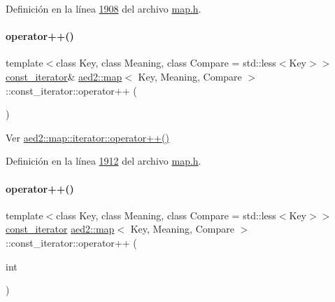 Definición en la línea \hyperlink{map_8h_source_l01908}{1908} del archivo \hyperlink{map_8h_source}{map.\+h}.

\mbox{\label{classaed2_1_1map_1_1const__iterator_adaada1d489552555135d2ea89c67c271_adaada1d489552555135d2ea89c67c271}} 
\paragraph{\texorpdfstring{operator++()}{operator++()}\hspace{0.1cm}{\footnotesize\ttfamily [1/2]}}
{\footnotesize\ttfamily template$<$class Key, class Meaning, class Compare = std\+::less$<$\+Key$>$$>$ \\
\hyperlink{classaed2_1_1map_1_1const__iterator}{const\+\_\+iterator}\& \hyperlink{classaed2_1_1map}{aed2\+::map}$<$ Key, Meaning, Compare $>$\+::const\+\_\+iterator\+::operator++ (\begin{DoxyParamCaption}{ }\end{DoxyParamCaption})\hspace{0.3cm}{\ttfamily [inline]}}



Ver \hyperlink{classaed2_1_1map_1_1iterator_a7c44de7f0508186e135ddbcfe782fec5_a7c44de7f0508186e135ddbcfe782fec5}{aed2\+::map\+::iterator\+::operator++()} 



Definición en la línea \hyperlink{map_8h_source_l01912}{1912} del archivo \hyperlink{map_8h_source}{map.\+h}.

\mbox{\label{classaed2_1_1map_1_1const__iterator_a2fbc216b2f11694bb567ea850bcfdb2e_a2fbc216b2f11694bb567ea850bcfdb2e}} 
\paragraph{\texorpdfstring{operator++()}{operator++()}\hspace{0.1cm}{\footnotesize\ttfamily [2/2]}}
{\footnotesize\ttfamily template$<$class Key, class Meaning, class Compare = std\+::less$<$\+Key$>$$>$ \\
\hyperlink{classaed2_1_1map_1_1const__iterator}{const\+\_\+iterator} \hyperlink{classaed2_1_1map}{aed2\+::map}$<$ Key, Meaning, Compare $>$\+::const\+\_\+iterator\+::operator++ (\begin{DoxyParamCaption}\item[{int}]{ }\end{DoxyParamCaption})\hspace{0.3cm}{\ttfamily [inline]}}



